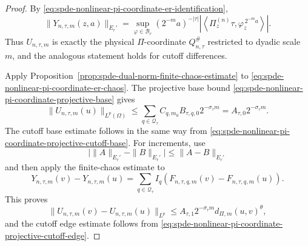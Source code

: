 \begin{proof}
By \eqref{eq:spde-nonlinear-pi-coordinate-er-identification},
\[
  \|Y_{n,\tau,m}(z,a)\|_{E_r'}
  =
  \sup_{\varphi\in\mathcal B_r}
  (2^{-m}a)^{-|\tau|}
  \left|
    \left\langle
      \Pi_z^{(n)}\tau,\varphi_z^{\,2^{-m}a}
    \right\rangle
  \right| .
\]
Thus \(U_{n,\tau,m}\) is exactly the physical
\(\Pi\)-coordinate \(Q_{n,\tau}^\#\) restricted to dyadic scale \(m\), and
the analogous statement holds for cutoff differences.

Apply Proposition~\ref{prop:spde-dual-norm-finite-chaos-estimate} to
\eqref{eq:spde-nonlinear-pi-coordinate-er-chaos}.  The projective base bound
\eqref{eq:spde-nonlinear-pi-coordinate-projective-base} gives
\begin{equation}
  \|U_{n,\tau,m}(u)\|_{L^p(\Omega)}
  \leq
  \sum_{q\in\mathcal Q_\tau}
  C_{q,m_0}B_{\tau,q,0}2^{-\sigma_\tau m}
  =
  A_{\tau,0}2^{-\sigma_\tau m}.
  \label{eq:spde-nonlinear-pi-coordinate-lp-base-proof}
\end{equation}
The cutoff base estimate follows in the same way from
\eqref{eq:spde-nonlinear-pi-coordinate-projective-cutoff-base}.  For
increments, use
\[
  \bigl|\|A\|_{E_r'}-\|B\|_{E_r'}\bigr|\leq\|A-B\|_{E_r'}
\]
and then apply the finite-chaos estimate to
\[
  Y_{n,\tau,m}(v)-Y_{n,\tau,m}(u)
  =
  \sum_{q\in\mathcal Q_\tau}
  I_q(F_{n,\tau,q,m}(v)-F_{n,\tau,q,m}(u)).
\]
This proves
\begin{equation}
  \|U_{n,\tau,m}(v)-U_{n,\tau,m}(u)\|_{L^p}
  \leq
  A_{\tau,1}2^{-\sigma_\tau m}d_{\Pi,m}(u,v)^\theta,
  \label{eq:spde-nonlinear-pi-coordinate-lp-edge-proof}
\end{equation}
and the cutoff edge estimate follows from
\eqref{eq:spde-nonlinear-pi-coordinate-projective-cutoff-edge}.


\end{proof}
